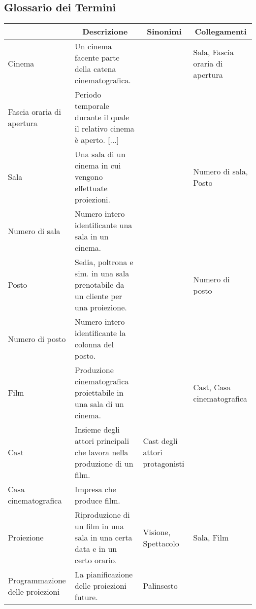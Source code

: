 \pagebreak

\subsection*{Glossario dei Termini}
%
%
\begin{longtable}{|p{3.86cm}|p{3.86cm}|p{3.86cm}|p{3.86cm}|}
    \hline
    \rowcolor{tblhdrcolor}
    \multicolumn{1}{|c|}{\textbf{Termine}}
     & \multicolumn{1}{|c|}{\textbf{Descrizione}}
     & \multicolumn{1}{|c|}{\textbf{Sinonimi}}
     & \multicolumn{1}{|c|}{\textbf{Collegamenti}}
    \\\hline
    Cinema
     & Un cinema facente parte della catena cinematografica.
     &
     & Sala, Fascia oraria di apertura
    \\\hline
    Fascia oraria di apertura
     & Periodo temporale durante il quale il relativo cinema è aperto. [...]
     &
     &
    \\ \hline
    Sala
     & Una sala di un cinema in cui vengono effettuate proiezioni.
     &
     & Numero di sala, Posto
    \\\hline
    Numero di sala
     & Numero intero identificante una sala in un cinema.
     &
     &
    \\\hline
    Posto
     & Sedia, poltrona e sim. in una sala prenotabile da un cliente
    per una proiezione.
     &
     & Numero di posto
    \\\hline
    Numero di posto
     & Numero intero identificante la colonna del posto.
     &
     &
    \\\hline
    Film
     & Produzione cinematografica proiettabile in una sala di un cinema.
     &
     & Cast, Casa cinematografica
    \\\hline
    Cast
     & Insieme degli attori principali che lavora nella produzione di un film.
     & Cast degli attori protagonisti
     &
    \\\hline
    Casa cinematografica
     & Impresa che produce film.
     &
     &
    \\ \hline
    Proiezione
     & Riproduzione di un film in una sala in una certa data e in un
    certo orario.
     & Visione, Spettacolo
     & Sala, Film
    \\ \hline
    Programmazione delle proiezioni
     & La pianificazione delle proiezioni future.
     & Palinsesto
     &
    \\ \hline

\end{longtable}
